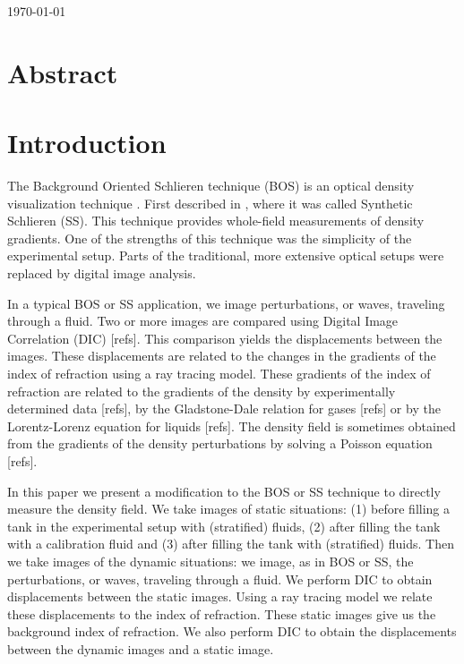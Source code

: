 \documentclass{article}
\begin{document}
\today
\section{Abstract}

\section{Introduction}
The Background Oriented Schlieren technique (BOS) is an optical density visualization technique \cite{meier2002computerized,raffel2015background}. First described in \cite{dalziel2000whole}, where it was called Synthetic Schlieren (SS). This technique provides whole-field measurements of density gradients. One of the strengths of this technique was the simplicity of the experimental setup. Parts of the traditional, more extensive optical setups were replaced by digital image analysis. 

In a typical BOS or SS application, we image perturbations, or waves, traveling through a fluid. Two or more images are compared using Digital Image Correlation (DIC) [refs]. This comparison yields the displacements between the images. These displacements are related to the changes in the gradients of the index of refraction using a ray tracing model. These gradients of the index of refraction are related to the gradients of the density by experimentally determined data [refs], by the Gladstone-Dale relation for gases [refs] or by the Lorentz-Lorenz equation for liquids [refs]. The density field is sometimes obtained from the gradients of the density perturbations by solving a Poisson equation [refs].

In this paper we present a modification to the BOS or SS technique to directly measure the density field. We take images of static situations:  (1) before filling a tank in the experimental setup with (stratified) fluids, (2) after filling the tank with a calibration fluid and (3) after filling the tank with (stratified) fluids. Then we take images of the dynamic situations: we image, as in BOS or SS, the perturbations, or waves, traveling through a fluid. We perform DIC to obtain displacements between the static images. Using a ray tracing model we relate these displacements to the index of refraction. These static images give us the background index of refraction. We also perform DIC to obtain the displacements between the dynamic images and a static image.
\end{document}
